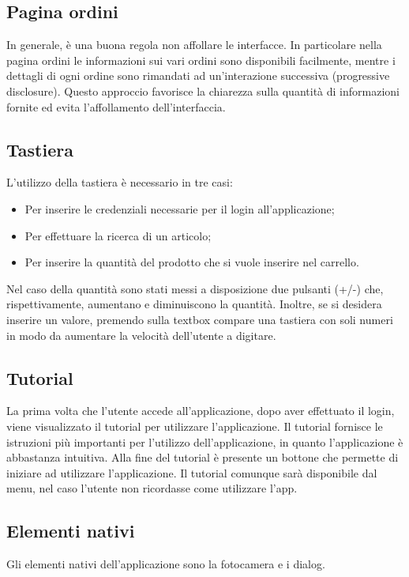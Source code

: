 \documentclass[12pt, a4paper, titlepage]{report}
\begin{document}
	\subsection{Pagina ordini}
	In generale, è una buona regola non affollare le interfacce. In particolare nella pagina ordini le informazioni sui vari ordini sono disponibili facilmente, mentre i dettagli di ogni ordine sono rimandati ad un'interazione successiva (progressive disclosure). Questo approccio favorisce la chiarezza sulla quantità di informazioni fornite ed evita l'affollamento dell'interfaccia.
	
	\subsection{Tastiera}
	L'utilizzo della tastiera è necessario in tre casi:
	\begin{itemize}
		\item Per inserire le credenziali necessarie per il login all'applicazione;
		\item Per effettuare la ricerca di un articolo;
		\item Per inserire la quantità del prodotto che si vuole inserire nel carrello.
	\end{itemize}
	Nel caso della quantità sono stati messi a disposizione due pulsanti (+/-) che, rispettivamente, aumentano e diminuiscono la quantità. Inoltre, se si desidera inserire un valore, premendo sulla textbox compare una tastiera con soli numeri in modo da aumentare la velocità dell'utente a digitare.
	
	\subsection{Tutorial}
	La prima volta che l'utente accede all'applicazione, dopo aver effettuato il login, viene visualizzato il tutorial per utilizzare l'applicazione. Il tutorial fornisce le istruzioni più importanti per l'utilizzo dell'applicazione, in quanto l'applicazione è abbastanza intuitiva. Alla fine del tutorial è presente un bottone che permette di iniziare ad utilizzare l'applicazione. Il tutorial comunque sarà disponibile dal menu, nel caso l'utente non ricordasse come utilizzare l'app.
	
	\subsection{Elementi nativi}
	Gli elementi nativi dell'applicazione sono la fotocamera e i dialog.
	
\end{document}

